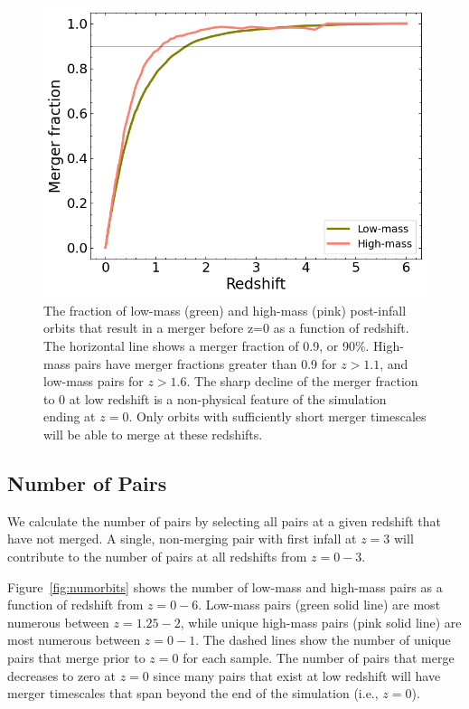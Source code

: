\documentclass[twocolumn,linenumbers]{aastex631}
\begin{document}
\begin{figure}[htb]
    \begin{center}
    \includegraphics[width=\columnwidth]{plots/bet-on-it/6_mergerfraction.png}
    \caption{The fraction of low-mass (green) and high-mass (pink) post-infall orbits that result in a merger before z=0 as a function of redshift. 
    The horizontal line shows a merger fraction of 0.9, or 90\%. 
    High-mass pairs have merger fractions greater than 0.9 for $z>1.1$, and low-mass pairs for $z>1.6$.
    The sharp decline of the merger fraction to 0 at low redshift is a non-physical feature of the simulation ending at $z=0$.
    Only orbits with sufficiently short merger timescales will be able to merge at these redshifts.}
    \label{fig:fmerge}
    \end{center}
\end{figure}

\subsection{Number of Pairs}\label{sec:pairprops-num}
We calculate the number of pairs by selecting all pairs at a given redshift that have not merged.
A single, non-merging pair with first infall at $z=3$ will contribute to the number of pairs at all redshifts from $z=0-3$. 

Figure~\ref{fig:numorbits} shows the number of low-mass and high-mass pairs as a function of redshift from $z=0-6$. 
Low-mass pairs (green solid line) are most numerous between $z=1.25-2$, while unique high-mass pairs (pink solid line) are most numerous between $z=0-1$.
The dashed lines show the number of unique pairs that merge prior to $z=0$ for each sample. 
The number of pairs that merge decreases to zero at $z=0$ since many pairs that exist at low redshift will have merger timescales that span beyond the end of the simulation (i.e., $z=0$). 
\end{document}
